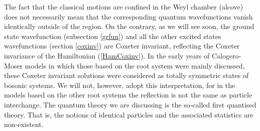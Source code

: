 \documentclass[a4paper,12pt]{article}
\begin{document}
The fact that the classical motions are confined in the Weyl
chamber (alcove) \coordHE{}  does not necessarily mean that the
corresponding quantum wavefunctions vanish identically outside of
the region.
On the contrary, as we will see soon, the ground state wavefunction
(subsection \ref{grfun}) and all the other excited states
wavefunctions (section \ref{coxinv}) are Coxeter invariant, reflecting
the Coxeter invariance of the Hamiltonian (\ref{HamCoxinv}).
In the early years of Calogero-Moser models in which those based on
the \coordHE{} root system were mainly discussed, these Coxeter invariant
solutions were considered as totally symmetric states of bosonic
systems. We will not, however, adopt this interpretation, for in
the models based on the other root systems the reflection is not the
same as particle interchange.
The quantum theory we are discussing is the so-called first quantised
theory.
That is, the notions of identical particles and the associated statistics
are non-existent.
\end{document}
